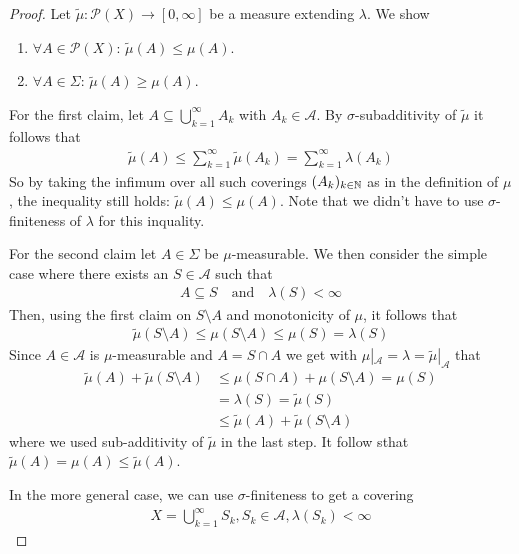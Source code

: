 \begin{proof}
  Let $\tilde{\mu}: \mathcal{P}(X) \to [0,\infty]$ be a measure extending $\lambda$.
  We show
  \begin{enumerate}[{(}i{)}]
    \item $\forall A \in \mathcal{P}(X)$: $\tilde{\mu}(A) \leq \mu(A)$.
    \item $\forall A \in \Sigma$: $\tilde{\mu}(A) \geq \mu(A)$.
  \end{enumerate}
  For the first claim, let $A \subseteq \bigcup_{k=1}^{\infty}A_k$ with $A_k \in \mathcal{A}$.
  By $\sigma$-subadditivity of $\tilde{\mu}$ it follows that
  \begin{align*}
    \tilde{\mu}(A) \leq \sum_{k=1}^{\infty}\tilde{\mu}(A_k) = \sum_{k=1}^{\infty}\lambda(A_k)
  \end{align*}
  So by taking the infimum over all such coverings $(A_k)_{k \in \mathbb{N}}$ as in the definition of $\mu$, the inequality still holds: $\tilde{\mu}(A) \leq \mu(A)$.
  Note that we didn't have to use $\sigma$-finiteness of $\lambda$ for this inquality.

  For the second claim let $A \in \Sigma$ be $\mu$-measurable. 
  We then consider the simple case where there exists an $S \in \mathcal{A}$ such that
  \begin{align*}
    A \subseteq S \quad \text{and} \quad \lambda(S) < \infty
  \end{align*}
  Then, using the first claim on $S \setminus A$ and monotonicity of $\mu$, it follows that
  \begin{align*}
    \tilde{\mu}(S \setminus A) \leq \mu(S \setminus A) \leq \mu(S) = \lambda(S)
  \end{align*}
    Since $A \in \mathcal{A}$ is $\mu$-measurable and $A = S \cap A$ we get with $\mu|_{\mathcal{A}} = \lambda = \tilde{\mu}|_{\mathcal{A}}$ that 
  \begin{align*}
    \tilde{\mu}(A) + \tilde{\mu}(S \setminus A) 
    &\leq
    \mu(S \cap A) + \mu(S \setminus A) = \mu(S)\\
    &=
    \lambda(S) = \tilde{\mu}(S)\\
    &\leq 
    \tilde{\mu}(A) + \tilde{\mu}(S \setminus A)
  \end{align*}
  where we used sub-additivity of $\tilde{\mu}$ in the last step.
  It follow sthat $\tilde{\mu}(A) = \mu(A) \leq \tilde{\mu}(A)$.

  In the more general case, we can use $\sigma$-finiteness to get a covering 
  \begin{align*}
    X = \bigcup_{k=1}^{\infty}S_k, S_k \in \mathcal{A}, \lambda(S_k) < \infty
  \end{align*}


\end{proof}
